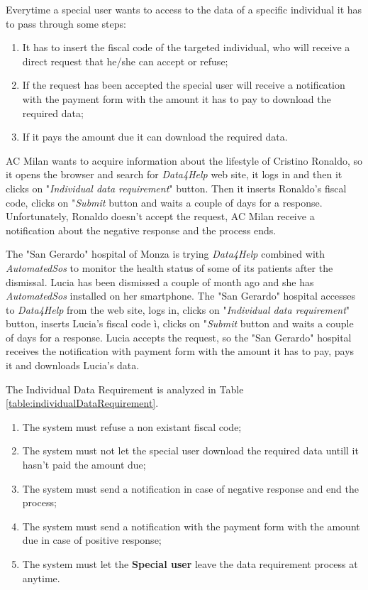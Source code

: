 Everytime a special user wants to access to the data of a specific individual it has to pass through some steps:
\begin{enumerate}
  \item It has to insert the fiscal code of the targeted individual, who will receive a direct request that he/she can accept or refuse;
  \item If the request has been accepted the special user will receive a notification with the payment form with the amount it has to pay to download the required data;
  \item If it pays the amount due it can download the required data.
\end{enumerate}

AC Milan wants to acquire information about the lifestyle of Cristino Ronaldo, so it opens the browser and search for \textit{Data4Help} web site, it logs in and then it clicks on "\textit{Individual data requirement}" button. Then it inserts Ronaldo's fiscal code, clicks on "\textit{Submit} button and waits a couple of days for a response. Unfortunately, Ronaldo doesn't accept the request, AC Milan receive a notification about the negative response and the process ends.

The "San Gerardo" hospital of Monza is trying \textit{Data4Help} combined with \textit{AutomatedSos} to monitor the health status of some of its patients after the dismissal. Lucia has been dismissed a couple of month ago and she has \textit{AutomatedSos} installed on her smartphone. The "San Gerardo" hospital accesses to \textit{Data4Help} from the web site, logs in, clicks on "\textit{Individual data requirement}" button, inserts Lucia's fiscal code ì, clicks on "\textit{Submit} button and waits a couple of days for a response. Lucia accepts the request, so the "San Gerardo" hospital receives the notification with payment form with the amount it has to pay, pays it and downloads Lucia's data.

The Individual Data Requirement is analyzed in Table \ref{table:individualDataRequirement}.

\begin{enumerate}
  \item The system must refuse a non existant fiscal code;
  \item The system must not let the special user download the required data untill it hasn't paid the amount due;
  \item The system must send a notification in case of negative response and end the process;
  \item The system must send a notification with the payment form with the amount due in case of positive response;
  \item The system must let the \textbf{Special user} leave the data requirement process at anytime.
\end{enumerate}


